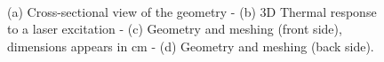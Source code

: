 
\begin{figure}
  \centering
	
	
  \hspace*{\fill}
	\hfill
	\hspace*{\fill} \\ \hspace*{\fill}
	\hfill
	\hspace*{\fill}
    
	
		\caption{(a) Cross-sectional view of the geometry - (b) 3D Thermal response to a laser 
	excitation - (c) Geometry and meshing (front side), dimensions appears in cm  - (d) 
	Geometry and meshing (back side).}
  \label{fig:2}
\end{figure}
